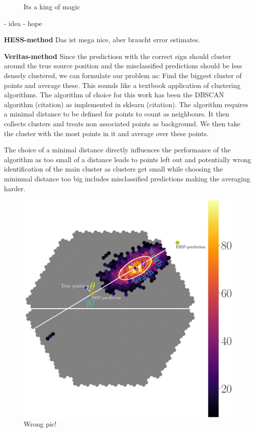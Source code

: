 \begin{figure}
\begin{subfigure}{0.3\textwidth}
    \end{subfigure}
    \caption{Its a king of magic}
    \label{fig:disp_cta_magic}
\end{figure}

- idea
- hope


\textbf{HESS-method}
Das ist mega nice, aber braucht error estimates.

\textbf{Veritas-method}
Since the predictiosn with the correct sign should cluster around the true source
position and the misclassified predictions should be less densely clustered, we 
can formulate our problem as: Find the biggest cluster of points and average these.
This sounds like a textbook application of clustering algorithms.
The algorithm of choice for this work has been the DBSCAN algorithm (citation)
as implemented in sklearn (citation). The algorithm requires a minimal distance to 
be defined for points to count as neighbours. It then collects clusters and 
treats non associated points as background. We then take the cluster with the most 
points in it and average over these points.

The choice of a minimal distance directly influences the performance 
of the algorithm as too small of a distance leads to points left out and potentially 
wrong identification of the main cluster as clusters get small while 
choosing the mininmal distance too big includes misclassified predictions 
making the averaging harder.

\begin{figure}
    \includegraphics[width=0.9\linewidth]{Plots/hillas_complete.pdf}
    \caption{Wrong pic!}
    \label{fig:disp_amb}
\end{figure}


